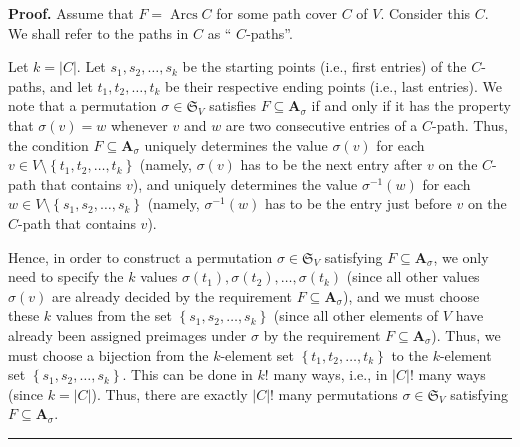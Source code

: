 \documentclass[numbers=enddot,12pt,final,onecolumn,notitlepage]{scrartcl}%
\numberwithin{exer}{section}
\theoremstyle{definition}
\newenvironment{proof}[1][Proof]{\noindent\textbf{#1.} }{\ \rule{0.5em}{0.5em}}
\newenvironment{vershort}{}{}
\begin{document}
\begin{vershort}
\begin{proof}
Assume that $F=\operatorname*{Arcs}C$ for some path cover $C$ of $V$. Consider
this $C$. We shall refer to the paths in $C$ as \textquotedblleft%
$C$-paths\textquotedblright.

Let $k=\left\vert C\right\vert $. Let $s_{1},s_{2},\ldots,s_{k}$ be the
starting points (i.e., first entries) of the $C$-paths, and let $t_{1}%
,t_{2},\ldots,t_{k}$ be their respective ending points (i.e., last entries).
We note that a permutation $\sigma\in\mathfrak{S}_{V}$ satisfies
$F\subseteq\mathbf{A}_{\sigma}$ if and only if it has the property that
$\sigma\left(  v\right)  =w$ whenever $v$ and $w$ are two consecutive entries
of a $C$-path. Thus, the condition $F\subseteq\mathbf{A}_{\sigma}$ uniquely
determines the value $\sigma\left(  v\right)  $ for each $v\in V\setminus
\left\{  t_{1},t_{2},\ldots,t_{k}\right\}  $ (namely, $\sigma\left(  v\right)
$ has to be the next entry after $v$ on the $C$-path that contains $v$), and
uniquely determines the value $\sigma^{-1}\left(  w\right)  $ for each $w\in
V\setminus\left\{  s_{1},s_{2},\ldots,s_{k}\right\}  $ (namely, $\sigma
^{-1}\left(  w\right)  $ has to be the entry just before $v$ on the $C$-path
that contains $v$).

Hence, in order to construct a permutation $\sigma\in\mathfrak{S}_{V}$
satisfying $F\subseteq\mathbf{A}_{\sigma}$, we only need to specify the $k$
values $\sigma\left(  t_{1}\right)  ,\sigma\left(  t_{2}\right)
,\ldots,\sigma\left(  t_{k}\right)  $ (since all other values $\sigma\left(
v\right)  $ are already decided by the requirement $F\subseteq\mathbf{A}%
_{\sigma}$), and we must choose these $k$ values from the set $\left\{
s_{1},s_{2},\ldots,s_{k}\right\}  $ (since all other elements of $V$ have
already been assigned preimages under $\sigma$ by the requirement
$F\subseteq\mathbf{A}_{\sigma}$). Thus, we must choose a bijection from the
$k$-element set $\left\{  t_{1},t_{2},\ldots,t_{k}\right\}  $ to the
$k$-element set $\left\{  s_{1},s_{2},\ldots,s_{k}\right\}  $. This can be
done in $k!$ many ways, i.e., in $\left\vert C\right\vert !$ many ways (since
$k=\left\vert C\right\vert $). Thus, there are exactly $\left\vert
C\right\vert !$ many permutations $\sigma\in\mathfrak{S}_{V}$ satisfying
$F\subseteq\mathbf{A}_{\sigma}$.
\end{proof}
\end{vershort}
\end{document}
